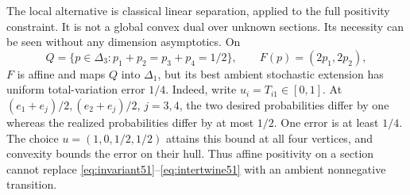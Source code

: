 The local alternative is classical linear separation, applied to the
full positivity constraint. It is not a global convex dual over
unknown sections. Its necessity can be seen without any dimension
asymptotics. On
\[
 Q=\{p\in\Delta_3:p_1+p_2=p_3+p_4=1/2\},
 \qquad F(p)=(2p_1,2p_2),
\]
$F$ is affine and maps $Q$ into $\Delta_1$, but its best ambient
stochastic extension has uniform total-variation error $1/4$. Indeed,
write $u_i=T_{i1}\in[0,1]$. At
$(e_1+e_j)/2,(e_2+e_j)/2$, $j=3,4$, the two desired probabilities
differ by one whereas the realized probabilities differ by at most
$1/2$. One error is at least $1/4$. The choice
$u=(1,0,1/2,1/2)$ attains this bound at all four vertices, and
convexity bounds the error on their hull. Thus affine positivity on a
section cannot replace \eqref{eq:invariant51}--\eqref{eq:intertwine51}
with an ambient nonnegative transition.
